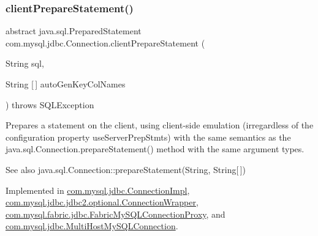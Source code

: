 \subsubsection{\texorpdfstring{client\+Prepare\+Statement()}{clientPrepareStatement()}\hspace{0.1cm}{\footnotesize\ttfamily [6/6]}}
{\footnotesize\ttfamily abstract java.\+sql.\+Prepared\+Statement com.\+mysql.\+jdbc.\+Connection.\+client\+Prepare\+Statement (\begin{DoxyParamCaption}\item[{String}]{sql,  }\item[{String \mbox{[}$\,$\mbox{]}}]{auto\+Gen\+Key\+Col\+Names }\end{DoxyParamCaption}) throws S\+Q\+L\+Exception\hspace{0.3cm}{\ttfamily [abstract]}}

Prepares a statement on the client, using client-\/side emulation (irregardless of the configuration property \textquotesingle{}use\+Server\+Prep\+Stmts\textquotesingle{}) with the same semantics as the java.\+sql.\+Connection.\+prepare\+Statement() method with the same argument types.

\begin{DoxySeeAlso}{See also}
java.\+sql.\+Connection\+::prepare\+Statement(\+String, String\mbox{[}$\,$\mbox{]}) 
\end{DoxySeeAlso}


Implemented in \mbox{\hyperlink{classcom_1_1mysql_1_1jdbc_1_1_connection_impl_a9fcf3d739e8b60bdc9666e938ecd75ab}{com.\+mysql.\+jdbc.\+Connection\+Impl}}, \mbox{\hyperlink{classcom_1_1mysql_1_1jdbc_1_1jdbc2_1_1optional_1_1_connection_wrapper_a7d857e3e39f13e33451b0f491adbd573}{com.\+mysql.\+jdbc.\+jdbc2.\+optional.\+Connection\+Wrapper}}, \mbox{\hyperlink{classcom_1_1mysql_1_1fabric_1_1jdbc_1_1_fabric_my_s_q_l_connection_proxy_ac36e9430178828a18476f6ef8cd0b28f}{com.\+mysql.\+fabric.\+jdbc.\+Fabric\+My\+S\+Q\+L\+Connection\+Proxy}}, and \mbox{\hyperlink{classcom_1_1mysql_1_1jdbc_1_1_multi_host_my_s_q_l_connection_aa9841555ae046be40f86ba4a2e4f79ed}{com.\+mysql.\+jdbc.\+Multi\+Host\+My\+S\+Q\+L\+Connection}}.

\mbox{\label{interfacecom_1_1mysql_1_1jdbc_1_1_connection_a7a8d8535f6988783755465a542f45ea1}} 
